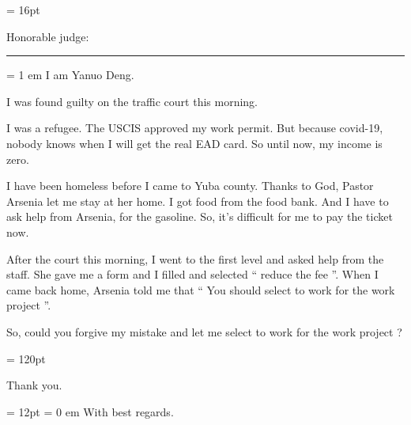 


\FFrg \baselineskip = 16pt

{ \medbreak } { \FFbi
Honorable judge:

}

{ \smallbreak } {\par\noindent\hrule} { \smallbreak }

\parindent = 1 em
I am Yanuo Deng. 

I was found guilty on the traffic court this morning. 

I was a refugee. The USCIS approved my work permit. But because covid-19, nobody knows when I will get the real EAD card. So until now, my income is zero. 

I have been homeless before I came to Yuba county. Thanks to God, Pastor Arsenia let me stay at her home. I got food from the food bank. And I have to ask help from Arsenia, for the gasoline. So, it's difficult for me to pay the ticket now.

After the court this morning, I went to the first level and asked help from the staff. 
She gave me a form and I filled and selected `` reduce the fee ''. 
When I came back home, Arsenia told me that `` You should select to work for the work project ''.

So, could you forgive my mistake and let me select to work for the work project ?

\baselineskip = 120pt

Thank you.

\baselineskip = 12pt
\parindent = 0 em
With best regards.

\bye
